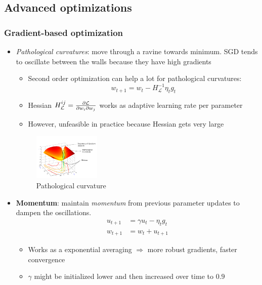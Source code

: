 \subsection{Advanced optimizations}
\subsubsection{Gradient-based optimization}
\begin{itemize}
	\item \textit{Pathological curvatures}: move through a ravine towards minimum. SGD tends to oscillate between the walls because they have high gradients
	\begin{itemize}
		\item Second order optimization can help a lot for pathological curvatures: $$w_{t+1} = w_{t} - H_{\mathcal{L}}^{-1} \eta_t g_t$$
		\item Hessian $H_{\mathcal{L}}^{ij} = \frac{\partial \mathcal{L}}{\partial w_i\partial w_j}$ works as adaptive learning rate per parameter
		\item However, unfeasible in practice because Hessian gets very large
	\end{itemize}
	\begin{figure}[ht!]
		\centering
		\includegraphics[width=0.3\textwidth]{figures/optimization_pathological_curvatures.png}
		\caption{Pathological curvature}
		\label{fig:optimization_pathological_curvatures}
	\end{figure}
	\item \textbf{Momentum}: maintain \textit{momentum} from previous parameter updates to dampen the oscillations.
	\begin{equation*}
		\begin{split}
			u_{t+1} & = \gamma u_{t} - \eta_t g_t \\
			w_{t+1} & = w_{t} + u_{t+1}
		\end{split}
	\end{equation*}
	\begin{itemize}
		\item Works as a exponential averaging $\Rightarrow$ more robust gradients, faster convergence
		\item $\gamma$ might be initialized lower and then increased over time to $0.9$

\end{itemize}
\end{itemize}
